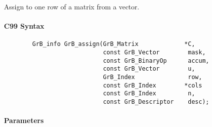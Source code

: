 Assign to one row of a matrix from a vector.  

\paragraph{C99 Syntax}

\begin{verbatim}
        GrB_info GrB_assign(GrB_Matrix             *C,
                            const GrB_Vector        mask,
                            const GrB_BinaryOp      accum,
                            const GrB_Vector        u,
                            GrB_Index               row,
                            const GrB_Index        *cols
                            const GrB_Index         n,
                            const GrB_Descriptor    desc); 
\end{verbatim}

\paragraph{Parameters}

